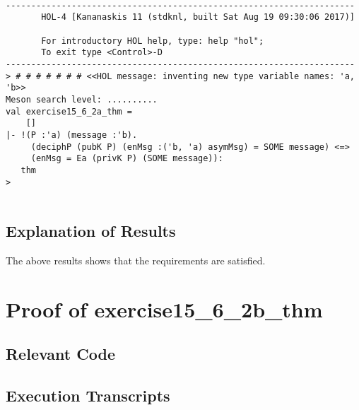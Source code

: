 \documentclass{report}
\begin{document}
\setcounter{sessioncount}{0}
\begin{session}
  \begin{scriptsize}
\begin{verbatim}

---------------------------------------------------------------------
       HOL-4 [Kananaskis 11 (stdknl, built Sat Aug 19 09:30:06 2017)]

       For introductory HOL help, type: help "hol";
       To exit type <Control>-D
---------------------------------------------------------------------
> # # # # # # # <<HOL message: inventing new type variable names: 'a, 'b>>
Meson search level: ..........
val exercise15_6_2a_thm =
    []
|- !(P :'a) (message :'b).
     (deciphP (pubK P) (enMsg :('b, 'a) asymMsg) = SOME message) <=>
     (enMsg = Ea (privK P) (SOME message)):
   thm
> 
 
\end{verbatim}
  \end{scriptsize}
\end{session}

\subsection{Explanation of Results}
\label{sec:explanation-results-2a}
The above results shows that the requirements are satisfied.


\section{Proof of exercise15_6_2b_thm}
\label{sec:proof-2b}

\subsection{Relevant Code}
\label{sec:relevant-code-2b}


\subsection{Execution Transcripts}
\label{sec:exec-transcr-2b}
\end{document}
